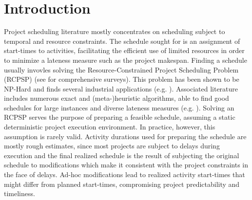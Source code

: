 \section{Introduction}
	
	
	Project scheduling literature mostly concentrates on scheduling
	subject to temporal and resource constraints.
	The schedule sought for is an assignment of start-times to activities,
	facilitating the efficient use of limited resources
	in order to minimize a lateness measure such as the project makespan.
	Finding a schedule usually invovles solving
	the Resource-Constrained Project Scheduling Problem (RCPSP) 
	(see \cite{artigues2013resource,hartmann2010survey} for comprehensive surveys).
	This problem has been shown to be \textsc{NP}-Hard \cite{blazewicz1983scheduling} and
	finds several industrial applications (e.g. \cite{bomsdorf2008model,bartels2009scheduling}).
	Associated literature includes numerous exact and (meta-)heuristic algorithms,
	able to find good schedules for large instances and diverse lateness measures
	(e.g. \cite{schutt2013solving,kone2011event,kolisch2006experimental,de2014novel}).
	Solving an RCPSP serves the purpose of preparing a feasible schedule,
	assuming a static deterministic project execution environment.
 	In practice, however, this assumption is rarely valid.
 	Activity durations used for preparing the schedule are mostly rough estimates,
 	since most projects are subject to delays during execution and
 	the final realized schedule is the result of 
 	subjecting the original schedule to modifications
 	which make it consistent with the project constraints in the face of delays.
 	Ad-hoc modifications lead to realized activity start-times 
 	that might differ from planned start-times,
  	compromising project predictability and timeliness.
	

